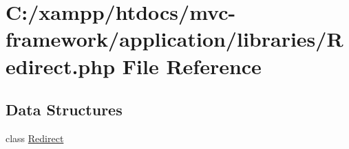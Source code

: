 \hypertarget{_redirect_8php}{}\section{C\+:/xampp/htdocs/mvc-\/framework/application/libraries/\+Redirect.php File Reference}
\label{_redirect_8php}
\subsection*{Data Structures}
\begin{DoxyCompactItemize}
\item 
class \hyperlink{class_redirect}{Redirect}
\end{DoxyCompactItemize}
